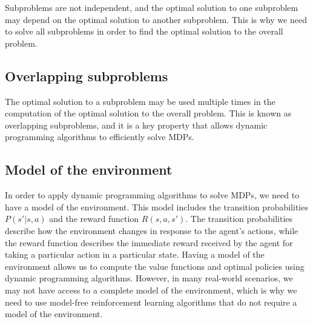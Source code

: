 \documentclass[conference]{IEEEtran}
\begin{document}
Subproblems are not independent, and the optimal solution to one subproblem may depend on the optimal solution to another subproblem. This is why we need to solve all subproblems in order to find the optimal solution to the overall problem.

\subsection*{Overlapping subproblems}
The optimal solution to a subproblem may be used multiple times in the computation of the optimal solution
to the overall problem. This is known as overlapping subproblems, and it is a key property that allows dynamic programming algorithms to efficiently solve MDPs.

\subsection*{Model of the environment}
In order to apply dynamic programming algorithms to solve MDPs, we need to have a model of the environment. This model includes the transition probabilities $P(s'|s,a)$ and the reward function $R(s,a,s')$. The transition probabilities describe how the environment changes in response to the agent's actions, while the reward function describes the immediate reward received by the agent for taking a particular action in a particular state.
Having a model of the environment allows us to compute the value functions and optimal policies using dynamic programming
algorithms. However, in many real-world scenarios, we may not have access to a complete model of the environment, which is why we need to use model-free reinforcement learning algorithms that do not require a model of the environment.
\end{document}
